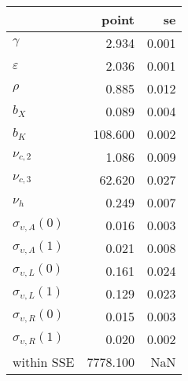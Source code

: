 \begin{tabular}{lrr}
\toprule
{} &     point &     se \\
\midrule
$\gamma$                 &     2.934 &  0.001 \\
$\varepsilon$            &     2.036 &  0.001 \\
$\rho$                   &     0.885 &  0.012 \\
$b_X$                    &     0.089 &  0.004 \\
$b_K$                    &   108.600 &  0.002 \\
$\nu_{c,2}$              &     1.086 &  0.009 \\
$\nu_{c,3}$              &    62.620 &  0.027 \\
$\nu_{h}$                &     0.249 &  0.007 \\
$\sigma_{\upsilon,A}(0)$ &     0.016 &  0.003 \\
$\sigma_{\upsilon,A}(1)$ &     0.021 &  0.008 \\
$\sigma_{\upsilon,L}(0)$ &     0.161 &  0.024 \\
$\sigma_{\upsilon,L}(1)$ &     0.129 &  0.023 \\
$\sigma_{\upsilon,R}(0)$ &     0.015 &  0.003 \\
$\sigma_{\upsilon,R}(1)$ &     0.020 &  0.002 \\
within SSE               &  7778.100 &    NaN \\
\bottomrule
\end{tabular}
